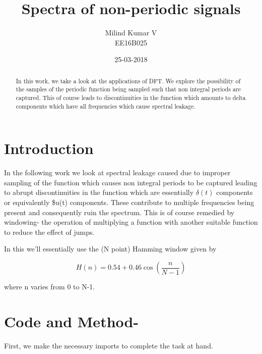 \documentclass[a4paper, 12pt, margin= 1.25cm]{article}
\title{Spectra of non-periodic signals}
\date{25-03-2018}
\author{Milind Kumar V\\ EE16B025}
\begin{document}
    
    
    \maketitle
    
    

    
    \begin{abstract}\label{abstract}

In this work, we take a look at the applications of DFT. We explore the
possibility of the samples of the periodic function being sampled such
that non integral periods are captured. This of course leads to
discontinuities in the function which amounts to delta components which
have all frequencies which cause spectral leakage.
\end{abstract}


\section{Introduction}\label{introduction}

In the following work we look at spectral leakage caused due to improper
sampling of the function which causes non integral periods to be
captured leading to abrupt discontinuities in the function which are
essentially \(\delta(t)\) components or equivalently \$u(t) components.
These contribute to multiple frequencies being present and consequently
ruin the spectrum. This is of course remedied by windowing- the
operation of multiplying a function with another suitable function to
reduce the effect of jumps.

In this we'll essentially use the (N point) Hamming window given by

\begin{equation}
H(n)= 0.54 + 0.46\cos(\frac{n}{N-1})
\end{equation}

where n varies from 0 to N-1.

    \section{Code and Method-}\label{code-and-method-}

First, we make the necessary imports to complete the task at hand.
\end{document}
